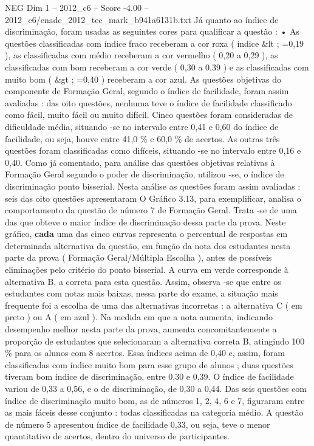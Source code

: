\begin{textsample}{NEG Dim 1 – 2012\_c6 – Score -4.00 – 2012\_c6/enade\_2012\_tec\_mark\_b941a6131b.txt}
Já quanto ao índice de discriminação, foram usadas as seguintes cores para qualificar a questão : • As questões classificadas com índice fraco receberam a cor roxa ( índice \&lt ; =0,19 ), as classificadas com médio receberam a cor vermelho ( 0,20 a 0,29 ), as classificadas com bom receberam a cor verde ( 0,30 a 0,39 ) e as classificadas com muito bom ( \&gt ; =0,40 ) receberam a cor azul.
As questões objetivas do componente de Formação Geral, segundo o índice de facilidade, foram assim avaliadas : das oito questões, nenhuma teve o índice de facilidade classificado como fácil, muito fácil ou muito difícil.
Cinco questões foram consideradas de dificuldade média, situando -se no intervalo entre 0,41 e 0,60 do índice de facilidade, ou seja, houve entre 41,0 \% e 60,0 \% de acertos.
As outras três questões foram classificadas como difíceis, situando -se no intervalo entre 0,16 e 0,40.
Como já comentado, para análise das questões objetivas relativas à Formação Geral segundo o poder de discriminação, utilizou -se, o índice de discriminação ponto bisserial.
Nesta análise as questões foram assim avaliadas : seis das oito questões apresentaram O Gráfico 3.13, para exemplificar, analisa o comportamento da questão de número 7 de Formação Geral.
Trata -se de uma das que obteve o maior índice de discriminação dessa parte da prova.
Neste gráfico, \textbf{cada} uma das cinco curvas representa o percentual de respostas em determinada alternativa da questão, em função da nota dos estudantes nesta parte da prova ( Formação Geral/Múltipla Escolha ), antes de possíveis eliminações pelo critério do ponto bisserial.
A curva em verde corresponde à alternativa B, a correta para esta questão.
Assim, observa -se que entre os estudantes com notas mais baixas, nessa parte do exame, a situação mais frequente foi a escolha de uma das alternativas incorretas : a alternativa C ( em preto ) ou A ( em azul ).
Na medida em que a nota aumenta, indicando desempenho melhor nesta parte da prova, aumenta concomitantemente a proporção de estudantes que selecionaram a alternativa correta B, atingindo 100 \% para os alunos com 8 acertos.
Essa índices acima de 0,40 e, assim, foram classificadas com índice muito bom para esse grupo de alunos ; duas questões tiveram bom índice de discriminação, entre 0,30 e 0,39.
O índice de facilidade variou de 0,33 a 0,56, e o de discriminação, de 0,30 a 0,44.
Das seis questões com índice de discriminação muito bom, as de números 1, 2, 4, 6 e 7, figuraram entre as mais fáceis desse conjunto : todas classificadas na categoria médio.
A questão de número 5 apresentou índice de facilidade 0,33, ou seja, teve o menor quantitativo de acertos, dentro do universo de participantes.

\end{textsample}
